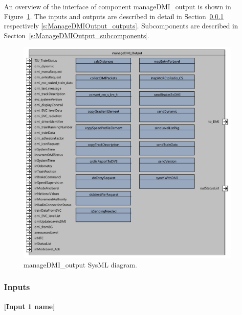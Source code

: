 An overview of the interface of component manageDMI\_output is shown in Figure~\ref{f:ManageDMIOutput}. The inputs and outputs are described in detail in Section~\ref{s:ManageDMIOutput_inputs} respectively \ref{s:ManageDMIOutput_outputs}. Subcomponents are described in Section~\ref{s:ManageDMIOutput_subcomponents}.

\begin{figure}
\center
\includegraphics[width=\textwidth]{images/F2_11_manageDMI_Output.pdf}
\caption{manageDMI\_output SysML diagram.}\label{f:ManageDMIOutput}
\end{figure}


\subsubsection{Inputs}\label{s:ManageDMIOutput_inputs}

\paragraph{[Input 1 name]}

